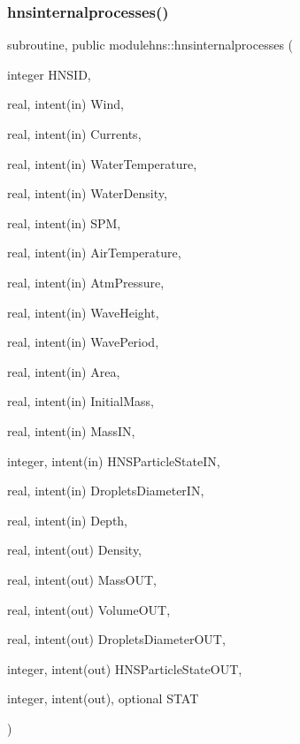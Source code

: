 \subsubsection{\texorpdfstring{hnsinternalprocesses()}{hnsinternalprocesses()}}
{\footnotesize\ttfamily subroutine, public modulehns\+::hnsinternalprocesses (\begin{DoxyParamCaption}\item[{integer}]{H\+N\+S\+ID,  }\item[{real, intent(in)}]{Wind,  }\item[{real, intent(in)}]{Currents,  }\item[{real, intent(in)}]{Water\+Temperature,  }\item[{real, intent(in)}]{Water\+Density,  }\item[{real, intent(in)}]{S\+PM,  }\item[{real, intent(in)}]{Air\+Temperature,  }\item[{real, intent(in)}]{Atm\+Pressure,  }\item[{real, intent(in)}]{Wave\+Height,  }\item[{real, intent(in)}]{Wave\+Period,  }\item[{real, intent(in)}]{Area,  }\item[{real, intent(in)}]{Initial\+Mass,  }\item[{real, intent(in)}]{Mass\+IN,  }\item[{integer, intent(in)}]{H\+N\+S\+Particle\+State\+IN,  }\item[{real, intent(in)}]{Droplets\+Diameter\+IN,  }\item[{real, intent(in)}]{Depth,  }\item[{real, intent(out)}]{Density,  }\item[{real, intent(out)}]{Mass\+O\+UT,  }\item[{real, intent(out)}]{Volume\+O\+UT,  }\item[{real, intent(out)}]{Droplets\+Diameter\+O\+UT,  }\item[{integer, intent(out)}]{H\+N\+S\+Particle\+State\+O\+UT,  }\item[{integer, intent(out), optional}]{S\+T\+AT }\end{DoxyParamCaption})}

